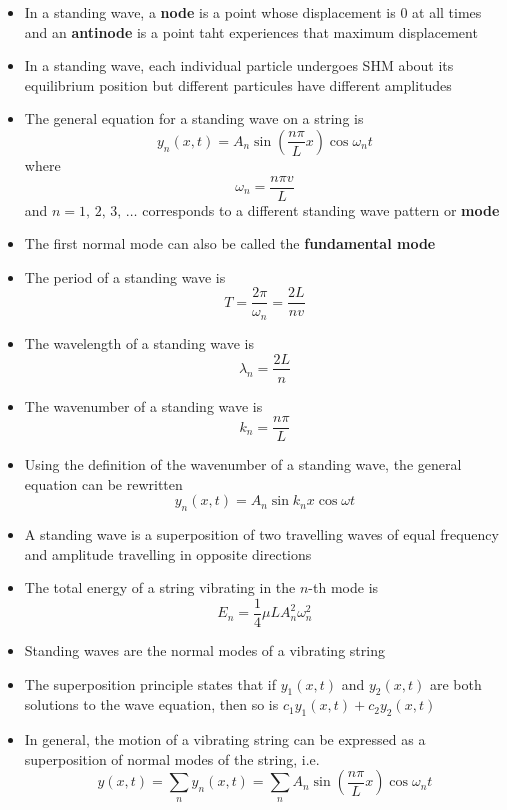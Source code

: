 \documentclass{article}
\begin{document}
\begin{itemize}
  \item In a standing wave, a \textbf{node} is a point whose displacement is $0$ at all times and an \textbf{antinode} is a point taht experiences that maximum displacement

  \item In a standing wave, each individual particle undergoes SHM about its equilibrium position but different particules have different amplitudes

  \item The general equation for a standing wave on a string is \[y_n(x, t) = A_n \sin \left( \frac{n \pi}{L} x \right) \cos \omega_n t\] where \[\omega_n = \frac{n \pi v}{L}\] and $n = 1, \,2, \,3, \,\ldots$ corresponds to a different standing wave pattern or \textbf{mode}

  \item The first normal mode can also be called the \textbf{fundamental mode}

  \item The period of a standing wave is \[T = \frac{2 \pi}{\omega_n} = \frac{2 L}{n v}\]

  \item The wavelength of a standing wave is \[\lambda_n = \frac{2 L}{n}\]

  \item The wavenumber of a standing wave is \[k_n = \frac{n \pi}{L}\]

  \item Using the definition of the wavenumber of a standing wave, the general equation can be rewritten \[y_n(x, t) = A_n \sin k_n x \cos \omega t\]

  \item A standing wave is a superposition of two travelling waves of equal frequency and amplitude travelling in opposite directions

  \item The total energy of a string vibrating in the $n$-th mode is \[E_n = \frac{1}{4} \mu L A_n^2 \omega_n^2\]

  \item Standing waves are the normal modes of a vibrating string

  \item The superposition principle states that if $y_1(x, t)$ and $y_2(x, t)$ are both solutions to the wave equation, then so is $c_1 y_1(x, t) + c_2 y_2(x, t)$

  \item In general, the motion of a vibrating string can be expressed as a superposition of normal modes of the string, i.e. \[y(x, t) = \sum_n y_n(x, t) = \sum_n A_n \sin \left( \frac{n \pi}{L} x \right) \cos \omega_n t\]


\end{itemize}
\end{document}
